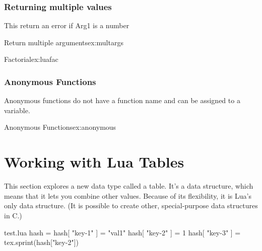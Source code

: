 \subsection{Returning multiple values}

This return an error if Arg1 is a number

\begin{texexample}{Return multiple arguments}{ex:multargs}
\end{texexample}


\begin{texexample}{Factorial}{ex:luafac}
\end{texexample}

\subsection{Anonymous Functions}

Anonymous functions do not have a function name and can be assigned to a variable. 

\begin{texexample}{Anonymous Functions}{ex:anonymous}
\end{texexample}

\chapter{Working with Lua Tables}

This section explores a new data type called a table. It's a data structure, which means that it lets
you combine other values. Because of its flexibility, it is Lua’s only data structure. (It is possible to
create other, special-purpose data structures in C.)
\begin{phdverbatim}
\begin{filecontents*}{test.lua}
  hash = {}
  hash[ "key-1" ] = "val1"
  hash[ "key-2" ] = 1
  hash[ "key-3" ] = {}
  tex.sprint(hash["key-2"])
\end{filecontents*}
\end{phdverbatim}


